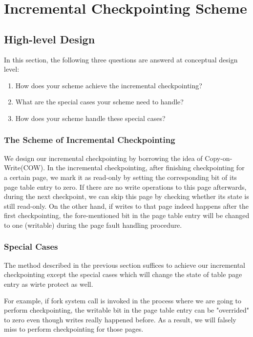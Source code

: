 \documentclass[11pt]{article}
\begin{document}
\section{Incremental Checkpointing Scheme}
\subsection{High-level Design}

In this section, the following three questions are answerd at conceptual design level:
\begin{enumerate}[(1)]
\item How does your scheme achieve the incremental checkpointing? 
\item What are the special cases your scheme need to handle? 
\item How does your scheme handle these special cases? 
\end{enumerate}

\subsubsection{The Scheme of Incremental Checkpointing}

We design our incremental checkpointing by borrowing the idea of Copy-on-Write(COW). In the incremental checkpointing, after finishing checkpointing for a certain page, we mark it as read-only by setting the corresponding bit of its page table entry to zero. If there are no write operations to this page afterwards, during the next checkpoint, we can skip this page by checking whether its state is still read-only. On the other hand, if writes to that page indeed happens after the first checkpointing, the fore-mentioned bit in the page table entry will be changed to one (writable) during the page fault handling procedure. 

\subsubsection{Special Cases}

The method described in the previous section suffices to achieve our incremental checkpointing except the special cases which will change the state of table page entry as wirte protect as well.  

For example, if fork system call is invoked in the process where we are going to perform checkpointing, the writable bit in the page table entry can be "overrided" to zero even though writes really happened before. As a result, we will falsely miss to perform checkpointing for those pages.
\end{document}
